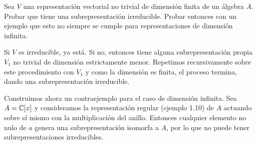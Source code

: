 \documentclass[twoside]{article}
\begin{document}
\begin{ejercicio}{1.20}
Sea $V$ una representación vectorial no trivial de dimensión finita de un álgebra $A$. Probar que tiene una subrepresentación irreducible. Probar entonces con un ejemplo que esto no siempre se cumple para representaciones de dimensión infinita.
\end{ejercicio}
\begin{solucion}
Si $V$ es irreducible, ya está. Si no, entonces tiene alguna subrepresentación propia $V_1$ no trivial de dimensión estrictamente menor. Repetimos recursivamente sobre este procedimiento con $V_1$ y como la dimensión es finita, el proceso termina, dando una subrepresentación irreducible.

Construimos ahora un contraejemplo para el caso de dimensión infinita. Sea $A=\mathbb{C}[x]$ y consideramos la representación regular (ejemplo 1.10) de $A$ actuando sobre sí mismo con la multiplicación del anillo. Entonces cualquier elemento no nulo de $a$ genera una subrepresentación isomorfa a $A$, por lo que no puede tener subrepresentaciones irreducibles. 

%
%
\end{solucion}

\newpage
\end{document}
